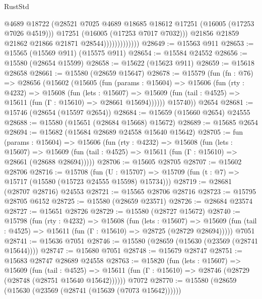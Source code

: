 \begin{lexlean}{RustStd}
\begin{coremodule}
                                @4689
                                @18722
                                (@28521
                                  @7025
                                  @4689
                                  @18685
                                  @18612
                                  @17251
                                  (@16005 (@17253 @7026 @4519)))
                                @17251
                                (@16005 (@17253 @7017 @7032)))
                              @21856
                              @21859
                              @21862
                              @21866
                              @21871
                              @28544)))))))))))))
@28649 := @15563 @911
@28653 := @15565 (@15569 @911) (@15575 @911)
@28654 := @15584 @24552
@28656 := @15580 (@28654 @15599)
@28658 := @15622 (@15623 @911)
@28659 := @15618 @28658
@28661 := @15580 (@28659 @15647)
@28678 := @15579
    (fun (fn : @76) =>
    @28656
      (@15602
        (@15605
          (fun (params : @15604) =>
          @15606
            (fun (rty : @4232) =>
            @15608
              (fun (lets : @15607) =>
              @15609 (fun (tail : @4525) => @15611 (fun (Γ : @15610) => @28661 @15694))))))
        @15740))
    @2654
@28681 := @15746 (@28654 (@15597 @2654))
@28684 := @15659 (@15660 @2654) @24555
@28688 := @15580 (@15651 (@28684 @15668) @15672)
@28689 := @15685 @2654
@28694 := @15682 (@15684 @28689 @24558 @15640 @15642)
@28705 := fun (params : @15604) =>
  @15606
    (fun (rty : @4232) =>
    @15608
      (fun (lets : @15607) =>
      @15609 (fun (tail : @4525) => @15611 (fun (Γ : @15610) => @28661 (@28688 @28694)))))
@28706 := @15605 @28705
@28707 := @15602 @28706
@28716 := @15708
    (fun (U : @15707) => @15709 (fun (t : @7) => @15717 (@15580 (@15723 @24555 @15598) @15734)))
@28719 := @28681 (@28707 @28716) @24553
@28721 := @15565 @28706 @28716
@28723 := @15795 @28705 @6152
@28725 := @15580 (@28659 @23571)
@28726 := @28684 @23574
@28727 := @15651 @28726
@28729 := @15580 (@28727 @15672)
@28740 := @15798
    (fun (rty : @4232) =>
    @15608
      (fun (lets : @15607) =>
      @15609 (fun (tail : @4525) => @15611 (fun (Γ : @15610) => @28725 (@28729 @28694)))))
    @7051
@28741 := @15636 @7051
@28746 := @15580 (@28659 (@15630 (@23569 (@28741 @15644))))
@28747 := @15680 @7051
@28748 := @15679 @28747
@28751 := @15683 @28747 @28689 @24558
@28763 := @15820
    (fun (lets : @15607) =>
    @15609
      (fun (tail : @4525) =>
      @15611 (fun (Γ : @15610) => @28746 (@28729 (@28748 (@28751 @15640 @15642))))))
    @7072
@28770 := @15580 (@28659 (@15630 (@23569 (@28741 (@15639 (@7073 @15642))))))

\end{coremodule}
\end{lexlean}
